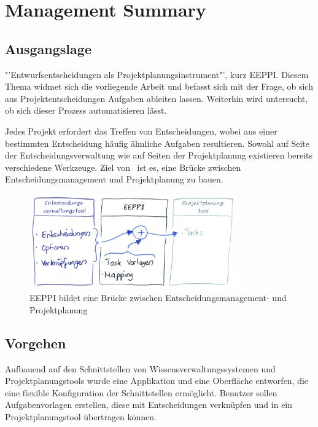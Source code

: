 \chapter*{Management Summary}
	\captionsetup[figure]{labelformat=empty} %

	
	\section*{Ausgangslage}
	
	"'Entwurfsentscheidungen als Projektplanungsinstrument"', kurz EEPPI. 
	Diesem Thema widmet sich die vorliegende Arbeit und befasst sich mit der Frage, 
	ob sich aus Projektentscheidungen Aufgaben ableiten lassen.
	Weiterhin wird untersucht, ob sich dieser Prozess automatisieren lässt.
	
	Jedes Projekt erfordert das Treffen von Entscheidungen, wobei aus einer bestimmten Entscheidung häufig ähnliche Aufgaben resultieren.
	Sowohl auf Seite der Entscheidungsverwaltung wie auf Seiten der Projektplanung existieren bereits verschiedene Werkzeuge.
	Ziel von \eeppi\ ist es, eine Brücke zwischen Entscheidungsmanagement und Projektplanung zu bauen.
	
	\begin{figure}[H]
		\includegraphics[width=0.8\textwidth]{introduction/img/eeppiVision.png}
		\centering
		\caption{EEPPI bildet eine Brücke zwischen Entscheidungsmanagement- und Projektplanung}
		\label{fig:eeppiBridgeBetweenDecisionsAndTasks}
	\end{figure}
	
	
	\section*{Vorgehen}
	
	Aufbauend auf den Schnittstellen von Wissensverwaltungssystemen und Projektplanungstools wurde eine Applikation und eine Oberfläche entworfen,
	die eine flexible Konfiguration der Schnittstellen ermöglicht.
	Benutzer sollen Aufgabenvorlagen erstellen, diese mit Entscheidungen verknüpfen und in ein Projektplanungstool übertragen können.
	
